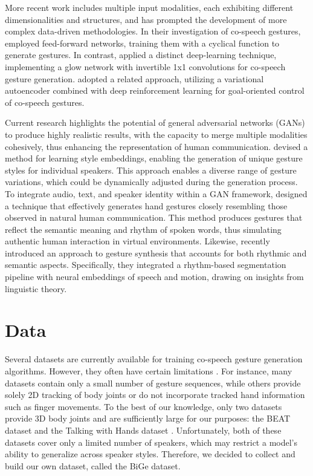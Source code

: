 \documentclass[sigconf]{acmart}
\begin{document}
More recent work includes multiple input modalities, each exhibiting different dimensionalities and structures, and has prompted the development of more complex data-driven methodologies. In their investigation of co-speech gestures, \citet{holdenPhasefunctionedNeuralNetworks2017a} employed feed-forward networks, training them with a cyclical function to generate gestures. In contrast, \citet{henterMoGlowProbabilisticControllable2020} applied a distinct deep-learning technique, implementing a glow network with invertible 1x1 convolutions for co-speech gesture generation. \citet{lingCharacterControllersUsing2020a} adopted a related approach, utilizing a variational autoencoder combined with deep reinforcement learning for goal-oriented control of co-speech gestures.

Current research highlights the potential of general adversarial networks (GANs) to produce highly realistic results, with the capacity to merge multiple modalities cohesively, thus enhancing the representation of human communication. \citet{ahujaStyleTransferCoSpeech2020} devised a method for learning style embeddings, enabling the generation of unique gesture styles for individual speakers. This approach enables a diverse range of gesture variations, which could be dynamically adjusted during the generation process.
To integrate audio, text, and speaker identity within a GAN framework, \citet{yoonSpeechGestureGeneration2020} designed a technique that effectively generates hand gestures closely resembling those observed in natural human communication. This method produces gestures that reflect the semantic meaning and rhythm of spoken words, thus simulating authentic human interaction in virtual environments.
Likewise, \citet{aoRhythmicGesticulatorRhythmAware2022a} recently introduced an approach to gesture synthesis that accounts for both rhythmic and semantic aspects. Specifically, they integrated a rhythm-based segmentation pipeline with neural embeddings of speech and motion, drawing on insights from linguistic theory.


\section{Data}
Several datasets are currently available for training co-speech gesture generation algorithms. However, they often have certain limitations \cite{nyatsangaComprehensiveReviewDataDriven2023b}. For instance, many datasets contain only a small number of gesture sequences, while others provide solely 2D tracking of body joints or do not incorporate tracked hand information such as finger movements.
To the best of our knowledge, only two datasets provide 3D body joints and are sufficiently large for our purposes: the BEAT dataset \cite{liuBEATLargeScaleSemantic2022a} and the Talking with Hands dataset \cite{leeTalkingHands162019,yoon2022genea}. Unfortunately, both of these datasets cover only a limited number of speakers, which may restrict a model's ability to generalize across speaker styles. Therefore, we decided to collect and build our own dataset, called the BiGe dataset.
\end{document}
